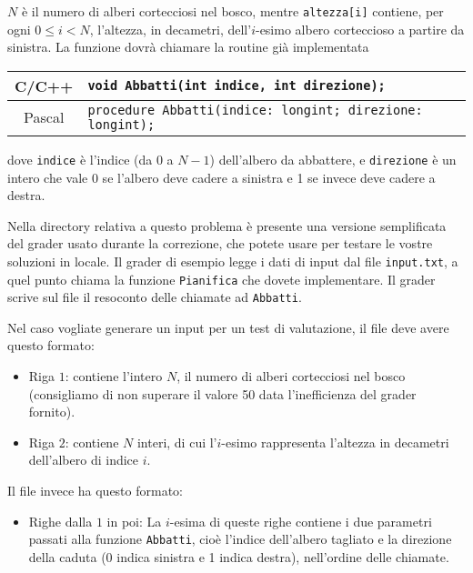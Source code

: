 ${N}$ è il numero di alberi cortecciosi nel bosco, mentre \texttt{altezza[i]} contiene, per ogni $0 \le {i} < {N}$, l'altezza, in decametri, dell'${i}$-esimo albero corteccioso a partire da sinistra. La funzione dovrà chiamare la routine già implementata

\begin{center}\begin{tabularx}{\textwidth}{|c|X|}
\hline
C/C++  & \verb|void Abbatti(int indice, int direzione);|\\
\hline
Pascal & \verb|procedure Abbatti(indice: longint; direzione: longint);|\\
\hline
\end{tabularx}\end{center}

dove \texttt{indice} è l'indice (da 0 a ${N}-1$) dell'albero da abbattere, e \texttt{direzione} è un intero che vale 0 se l'albero deve cadere a sinistra e 1 se invece deve cadere a destra.

\Grader
Nella directory relativa a questo problema è presente una versione 
semplificata del grader usato durante la correzione, che potete usare
per testare le vostre soluzioni in locale. Il grader di esempio legge
i dati di input dal file \texttt{input.txt}, a quel punto chiama la
funzione \texttt{Pianifica} che dovete implementare. Il grader scrive sul file \outputfile{} il resoconto delle chiamate ad \texttt{Abbatti}.

Nel caso vogliate generare un input per un test di valutazione, il file  deve avere questo formato:

\begin{itemize}[nolistsep,itemsep=2mm]
\item Riga $1$: contiene l'intero ${N}$, il numero di alberi cortecciosi nel bosco (consigliamo di non superare il valore 50 data l'inefficienza del grader fornito).
\item Riga $2$: contiene ${N}$ interi, di cui l'${i}$-esimo rappresenta l'altezza in decametri dell'albero di indice ${i}$.
\end{itemize}

Il file \outputfile{} invece ha questo formato:
\begin{itemize}[nolistsep,itemsep=2mm]
\item Righe dalla $1$ in poi: La $i$-esima di queste righe contiene i due parametri passati alla funzione \texttt{Abbatti}, cioè l'indice dell'albero tagliato e la direzione della caduta (0 indica sinistra e 1 indica destra), nell'ordine delle chiamate.
\end{itemize}

